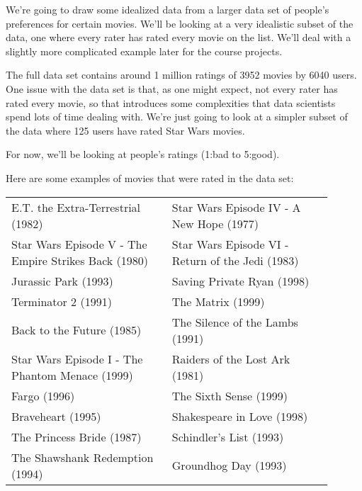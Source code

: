 \documentclass{ximera}
\begin{document}
\begin{exploration}

  We're going to draw some idealized data from a larger data set of people's preferences for certain movies. We'll be looking at a very idealistic subset of the data, one where every rater has rated every movie on the list. We'll deal with a slightly more complicated example later for the course projects. 

  The full data set contains around 1 million ratings of 3952 movies by 6040 users. One issue with the data set is that, as one might expect, not every rater has rated every movie, so that introduces some complexities that data scientists spend lots of time dealing with. We're just going to look at a simpler subset of the data where 125 users have rated Star Wars movies.

  For now, we'll be looking at people's ratings (1:bad to 5:good).

  Here are some examples of movies that were rated in the data set:
  \vspace{1em}

  \begin{small} %
    \begin{tabular}{p{0.45\linewidth} p{0.45\linewidth}} %
      E.T. the Extra-Terrestrial (1982) & Star Wars Episode IV - A New Hope (1977) \\
      Star Wars Episode V - The Empire Strikes Back (1980) & Star Wars Episode VI - Return of the Jedi (1983) \\
      Jurassic Park (1993) & Saving Private Ryan (1998) \\
      Terminator 2 (1991) & The Matrix (1999) \\
      Back to the Future (1985) & The Silence of the Lambs (1991) \\
      Star Wars Episode I - The Phantom Menace (1999) & Raiders of the Lost Ark (1981) \\
      Fargo (1996) & The Sixth Sense (1999) \\
      Braveheart (1995) & Shakespeare in Love (1998) \\
      The Princess Bride (1987) & Schindler's List (1993) \\
      The Shawshank Redemption (1994) & Groundhog Day (1993) \\
    \end{tabular}
    \end{small}


\end{exploration}
\end{document}
